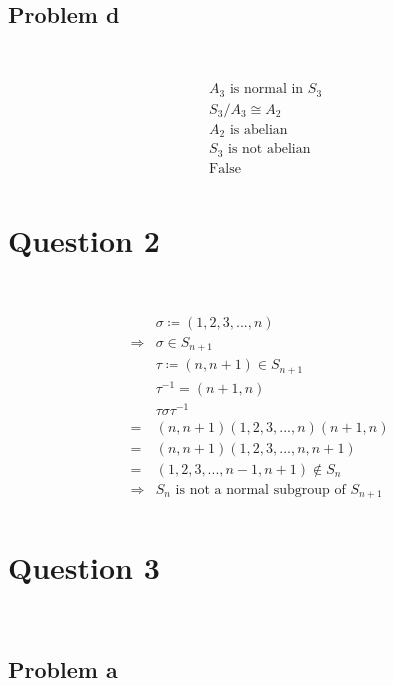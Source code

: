 \documentclass{article}
\begin{document}
~

\subsection*{Problem d}

~

\begin{equation*}
    \begin{split}
        &A_3\text{ is normal in }S_3\\
        &S_3/A_3\cong A_2\\
        &A_2\text{ is abelian}\\
        &S_3\text{ is not abelian}\\
        &\text{False}\\
    \end{split}
\end{equation*}

\newpage

\section*{Question 2}

~

\begin{equation*}
    \begin{split}
        &\sigma\coloneqq (1,2,3,...,n)\\
        \Rightarrow&\sigma\in S_{n+1}\\
        &\tau\coloneqq (n,n+1)\in S_{n+1}\\
        &\tau^{-1}=(n+1,n)\\
        &\tau\sigma\tau^{-1}\\
        =&(n,n+1)(1,2,3,...,n)(n+1,n)\\
        =&(n,n+1)(1,2,3,...,n,n+1)\\
        =&(1,2,3,...,n-1,n+1)\notin S_n\\
        \Rightarrow&S_n\text{ is not a normal subgroup of }S_{n+1}\\
    \end{split}
\end{equation*}

\newpage

\section*{Question 3}

~

\subsection*{Problem a}
\end{document}
